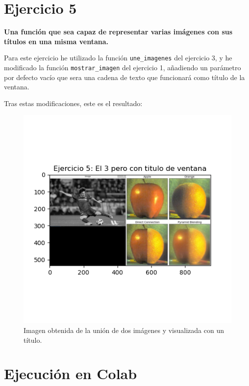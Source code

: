 \documentclass[12pt, spanish]{article}
\begin{document}
\newpage

\section{Ejercicio 5}

\textbf{\large Una función que sea capaz de representar varias imágenes con sus títulos en una misma ventana.}

Para este ejercicio he utilizado la función \texttt{une\_imagenes} del ejercicio 3, y he modificado la función \texttt{mostrar\_imagen} del ejercicio 1, añadiendo un parámetro por defecto vacío que sera una cadena de texto que funcionará como título de la ventana.

Tras estas modificaciones, este es el resultado: 

\begin{figure}[H]
	\centering
	\includegraphics[scale = 1]{union_titulo.png}
	\caption{Imagen obtenida de la unión de dos imágenes y visualizada con un título.}
	\label{fig:ej5}
	
\end{figure}

\newpage

\section{Ejecución en Colab}
\end{document}
